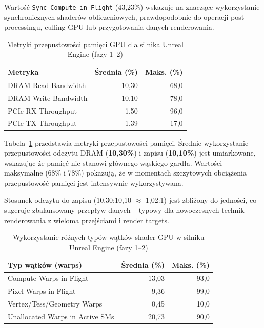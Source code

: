 Wartość \texttt{Sync Compute in Flight} (43,23\%) wskazuje na znaczące wykorzystanie synchronicznych shaderów obliczeniowych, 
prawdopodobnie do operacji post-processingu, culling GPU lub przygotowania danych renderowania.

\begin{table}[H]
\centering
\caption{Metryki przepustowości pamięci GPU dla silnika Unreal Engine (fazy 1--2)}
\label{tab:unreal-memory-metrics}
\begin{tabular}{|l|r|r|}
\hline
\textbf{Metryka} & \textbf{Średnia (\%)} & \textbf{Maks. (\%)} \\
\hline
DRAM Read Bandwidth & 10,30 & 68,0 \\
DRAM Write Bandwidth & 10,10 & 78,0 \\
PCIe RX Throughput & 1,50 & 96,0 \\
PCIe TX Throughput & 1,39 & 17,0 \\
\hline
\end{tabular}
\end{table}


Tabela~\ref{tab:unreal-memory-metrics} przedstawia metryki przepustowości pamięci. Średnie wykorzystanie przepustowości odczytu 
DRAM (\textbf{10,30\%}) i zapisu (\textbf{10,10\%}) jest umiarkowane, wskazując że pamięć nie stanowi głównego wąskiego gardła. 
Wartości maksymalne (68\% i 78\%) pokazują, że w momentach szczytowych obciążenia przepustowość pamięci jest intensywnie wykorzystywana.

Stosunek odczytu do zapisu (10,30:10,10 $\approx$ 1,02:1) jest zbliżony do jedności, co sugeruje zbalansowany przepływ danych -- 
typowy dla nowoczesnych technik renderowania z wieloma przejściami i render targets.

\begin{table}[H]
\centering
\caption{Wykorzystanie różnych typów wątków shader GPU w silniku Unreal Engine (fazy 1--2)}
\label{tab:unreal-warps}
\begin{tabular}{|l|r|r|}
\hline
\textbf{Typ wątków (warps)} & \textbf{Średnia (\%)} & \textbf{Maks. (\%)} \\
\hline
Compute Warps in Flight & 13,03 & 93,0 \\
Pixel Warps in Flight & 9,36 & 99,0 \\
Vertex/Tess/Geometry Warps & 0,45 & 10,0 \\
Unallocated Warps in Active SMs & 20,73 & 90,0 \\
\hline
\end{tabular}
\end{table}


